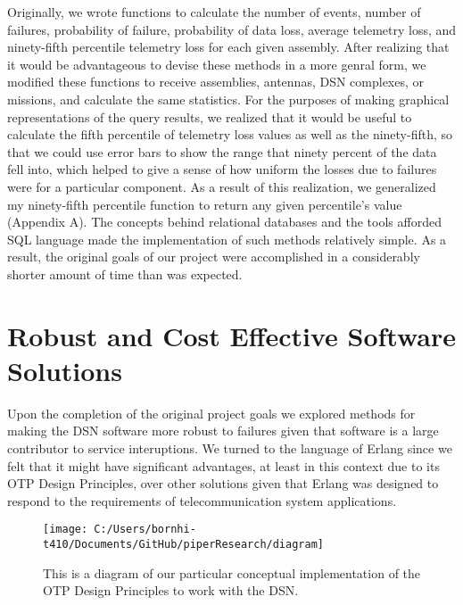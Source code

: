 \documentclass[aps,twocolumn,nobalancelastpage,amsmath,amssymb,
nofootinbib,superscriptaddress, ]{revtex4}
\begin{document}
Originally, we wrote functions to calculate the number of events, number of failures, probability of failure, probability of data loss, average telemetry loss, and ninety-fifth percentile telemetry loss for each given assembly. After realizing that it would be advantageous to devise these methods in a more genral form, we  modified these functions to receive assemblies, antennas, DSN complexes, or missions, and calculate the same statistics. For the purposes of making graphical representations of the query results, we realized that it would be useful to calculate the fifth percentile of telemetry loss values as well as the ninety-fifth, so that we could use error bars to show the range that ninety percent of the data fell into, which helped to give a sense of how uniform the losses due to failures were for a particular component. As a result of this realization, we generalized my ninety-fifth percentile function to return any given percentile’s value (Appendix A). The concepts behind relational databases and the tools afforded SQL language made the implementation of such methods relatively simple. As a result, the original goals of our project were accomplished in a considerably shorter amount of time than was expected.


\section{Robust and Cost Effective Software Solutions}

Upon the completion of the original project goals we explored methods for making the DSN software more robust to failures given that software is a large contributor to service interuptions. We turned to the language of Erlang since we felt that it might have significant advantages, at least in this context due to its OTP Design Principles, over other solutions given that Erlang was designed to respond to the requirements of telecommunication system applications. \cite{armstrong2003}

\begin{figure}[h]
\texttt{[image: C:/Users/bornhi-t410/Documents/GitHub/piperResearch/diagram]}
\caption{This is a diagram of our particular conceptual implementation of the OTP Design Principles to work with the DSN. \label{fig:diagram}}
\end{figure}
\end{document}
